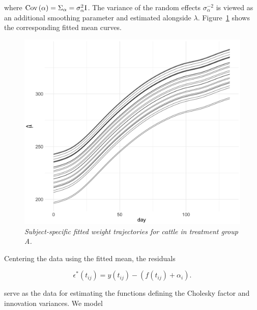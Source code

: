\noindent
where $\textup{Cov}\left(\alpha\right) = \Sigma_\alpha = \sigma_\alpha^2 \mathrm{I}$. The variance of the random effects $\sigma^{-2}_\alpha$  is viewed as an additional smoothing parameter and estimated alongside $\lambda$. Figure~\ref{fig:cattleA-smoothed-weights-vs-time} shows the corresponding fitted mean curves. 

%

\begin{figure}[H] 
\begin{center}
\includegraphics[width = .7\textwidth]{img/cattle/cattleA-weights-vs-time-mean-fit}
\caption{\textit{Subject-specific fitted weight trajectories for cattle in treatment group A. }}
\label{fig:cattleA-smoothed-weights-vs-time}
\end{center}
\end{figure} 

Centering the data using the fitted mean, the residuals 

\begin{equation} \label{eq:cattleA-dynamic-cond-mixed-model-2}
\epsilon^*\left(t_{ij}\right) = y\left(t_{ij}\right) - \left(f\left(t_{ij} \right) + \alpha_{i}\right).
\end{equation}

\noindent
serve as the data for estimating the functions defining the Cholesky factor and innovation variances. We model

